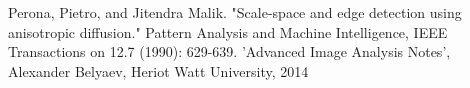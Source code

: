 \documentclass[a4paper, 10pt, conference] {article}
\begin{document}
\begin{thebibliography}{99}
Perona, Pietro, and Jitendra Malik. "Scale-space and edge detection using anisotropic diffusion." Pattern Analysis and Machine Intelligence, IEEE Transactions on 12.7 (1990): 629-639.
'Advanced Image Analysis Notes', Alexander Belyaev, Heriot Watt University, 2014
\end{thebibliography}
\end{document}
